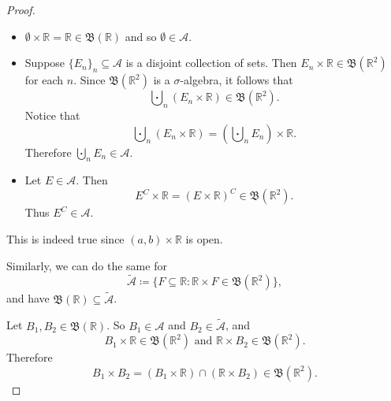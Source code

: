 \documentclass[notoc,notitlepage]{tufte-book}
\begin{document}
\begin{proof}
  \noindent
  \begin{itemize}
    \item $\emptyset \times \mathbb{R} = \mathbb{R} \in \mathfrak{B}(\mathbb{R})$
      and so $\emptyset \in \mathcal{A}$.
    \item Suppose $\{ E_n \}_n \subseteq \mathcal{A}$ is a disjoint collection
      of sets.
      Then $E_n \times \mathbb{R} \in \mathfrak{B}(\mathbb{R}^2)$ for each $n$.
      Since $\mathfrak{B}(\mathbb{R}^2)$ is a $\sigma$-algebra,
      it follows that
      \begin{equation*}
        \bigcupdot_{n} (E_n \times \mathbb{R}) \in \mathfrak{B}(\mathbb{R}^2).
      \end{equation*}
      Notice that
      \begin{equation*}
        \bigcupdot_{n} (E_n \times \mathbb{R})
        = \left( \bigcupdot_{n} E_n \right) \times \mathbb{R}.
      \end{equation*}
      Therefore $\bigcupdot_{n} E_n \in \mathcal{A}$.
    \item Let $E \in \mathcal{A}$. Then
      \begin{equation*}
        E^C \times \mathbb{R}
        = (E \times \mathbb{R})^C \in \mathfrak{B}(\mathbb{R}^2).
      \end{equation*}
      Thus $E^C \in \mathcal{A}$.
  \end{itemize}

  \noindent
  This is indeed true since $(a, b) \times \mathbb{R}$ is open.

  Similarly, we can do the same for
  \begin{equation*}
    \tilde{\mathcal{A}} \coloneqq \{ F \subseteq \mathbb{R}
            : \mathbb{R} \times F \in \mathfrak{B}(\mathbb{R}^2) \},
  \end{equation*}
  and have $\mathfrak{B}(\mathbb{R}) \subseteq \tilde{\mathcal{A}}$.

  Let $B_1, B_2 \in \mathfrak{B}(\mathbb{R})$.
  So $B_1 \in \mathcal{A}$ and $B_2 \in \tilde{\mathcal{A}}$,
  and
  \begin{equation*}
    B_1 \times \mathbb{R} \in \mathfrak{B}(\mathbb{R}^2)
    \text{ and }
    \mathbb{R} \times B_2 \in \mathfrak{B}(\mathbb{R}^2).
  \end{equation*}
  Therefore
  \begin{equation*}
    B_1 \times B_2 = (B_1 \times \mathbb{R}) \cap (\mathbb{R} \times B_2)
      \in \mathfrak{B}(\mathbb{R}^2).
  \end{equation*}
\end{proof}
\end{document}
